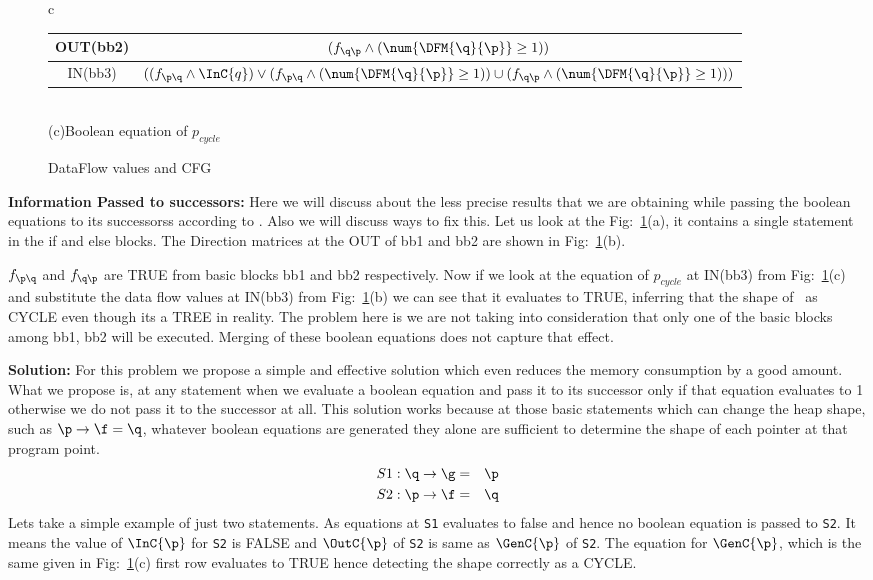 \begin{figure}[h]
\begin{tabular}{c}
{\begin{tabular}[b]{|c@{}|@{}c|}
OUT(bb2) &
$(f_{\q\p} \wedge (\num{\DFM{\q}{\p}} \geq 1))$ \\ \hline

IN(bb3) & 
$((f_{\p\q} \wedge \InC{q}) \vee (f_{\p\q} \wedge (\num{\DFM{\q}{\p}} \geq 1)) \cup (f_{\q\p} \wedge (\num{\DFM{\q}{\p}} \geq 1)))$ \\ \hline
\end{tabular} 
} \\  

\footnotesize (c)Boolean equation of {\tt $p_{cycle}$}  \\
\end{tabular}
\caption{DataFlow values and CFG} \label{if-else-cfg}
\end{figure}

\textbf{Information Passed to successors: }
Here we will discuss about the less precise results that we are obtaining while passing the boolean equations to its successorss according to 
\cite{Sandeep}. Also we will discuss ways to fix this.
Let us look at the Fig:~\ref{if-else-cfg}(a), it contains a single statement in the if and else blocks.
The Direction matrices at the OUT of bb1 and bb2 are shown in Fig:~\ref{if-else-cfg}(b).
 
$f_{\p\q}$ and $f_{\q\p}$  are TRUE from basic blocks bb1 and bb2 respectively. Now if we look at the equation of {\tt $p_{cycle}$} at IN(bb3) 
from Fig:~\ref{if-else-cfg}(c) and substitute the data flow values at IN(bb3) from  Fig:~\ref{if-else-cfg}(b) we can see that it evaluates to TRUE,
inferring that the shape of \p\ as CYCLE even though its a TREE in reality. The problem here is we are not taking into consideration that only one of the 
basic blocks among bb1, bb2 will be executed.
Merging of these boolean equations does not capture that effect.

\textbf{Solution: }For this problem we propose a simple and effective solution which even reduces the memory consumption
by a good amount. What we propose is, at any statement when we evaluate a boolean equation and pass it to its successor only if that equation
evaluates to 1 otherwise we do not pass it to the successor at all. This solution works because at those basic statements which can change the heap shape,
such as $\p \rightarrow \f =\q$, whatever boolean equations are generated they alone are sufficient to determine the shape of each pointer at that program 
point.
  \begin{eqnarray*}
  S1: \q \rightarrow \g &=& \p \\
  S2: \p \rightarrow \f &=& \q   
  \end{eqnarray*}
Lets take a simple example of just two statements. 
As equations at {\tt S1} evaluates to false and hence no boolean equation is passed to {\tt S2}. It means the value of  $\InC{\p}$ for {\tt S2} 
is FALSE and $\OutC{\p}$ of {\tt S2} is same as $\GenC{\p}$ of {\tt S2}. The equation for $\GenC{\p}$, which is the same given in Fig:~\ref{if-else-cfg}(c) first row 
evaluates to TRUE hence detecting the shape correctly as a CYCLE. 

